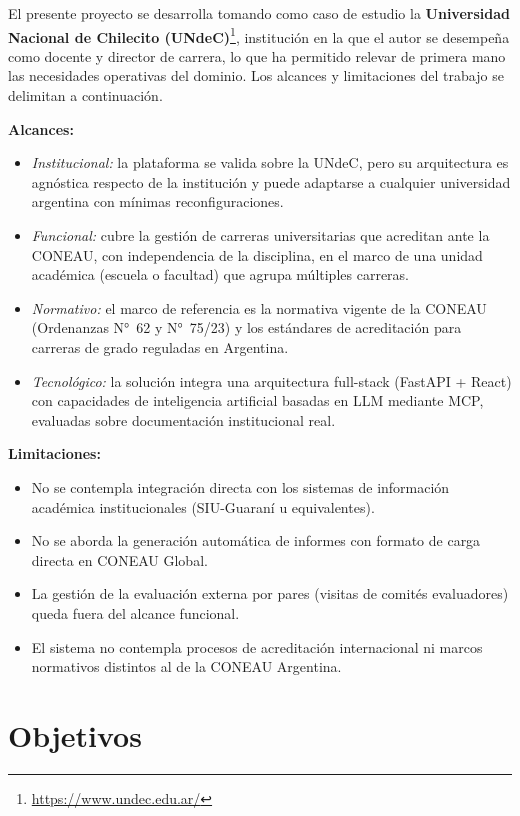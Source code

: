 El presente proyecto se desarrolla tomando como caso de estudio la \textbf{Universidad Nacional de Chilecito (UNdeC)}\footnote{\url{https://www.undec.edu.ar/}}, instituci\'{o}n en la que el autor se desempe\~{n}a como docente y director de carrera, lo que ha permitido relevar de primera mano las necesidades operativas del dominio. Los alcances y limitaciones del trabajo se delimitan a continuaci\'{o}n.

\textbf{Alcances:}
\begin{itemize}
    \item \textit{Institucional:} la plataforma se valida sobre la UNdeC, pero su arquitectura es agn\'{o}stica respecto de la instituci\'{o}n y puede adaptarse a cualquier universidad argentina con m\'{i}nimas reconfiguraciones.
    \item \textit{Funcional:} cubre la gesti\'{o}n de carreras universitarias que acreditan ante la CONEAU, con independencia de la disciplina, en el marco de una unidad acad\'{e}mica (escuela o facultad) que agrupa m\'{u}ltiples carreras.
    \item \textit{Normativo:} el marco de referencia es la normativa vigente de la CONEAU (Ordenanzas N°~62 y N°~75/23) y los est\'{a}ndares de acreditaci\'{o}n para carreras de grado reguladas en Argentina.
    \item \textit{Tecnol\'{o}gico:} la soluci\'{o}n integra una arquitectura full-stack (FastAPI + React) con capacidades de inteligencia artificial basadas en LLM mediante MCP, evaluadas sobre documentaci\'{o}n institucional real.
\end{itemize}

\textbf{Limitaciones:}
\begin{itemize}
    \item No se contempla integraci\'{o}n directa con los sistemas de informaci\'{o}n acad\'{e}mica institucionales (SIU-Guaran\'{i} u equivalentes).
    \item No se aborda la generaci\'{o}n autom\'{a}tica de informes con formato de carga directa en CONEAU Global.
    \item La gesti\'{o}n de la evaluaci\'{o}n externa por pares (visitas de comit\'{e}s evaluadores) queda fuera del alcance funcional.
    \item El sistema no contempla procesos de acreditaci\'{o}n internacional ni marcos normativos distintos al de la CONEAU Argentina.
\end{itemize}

\section{Objetivos}
\label{sec:objetivos}

